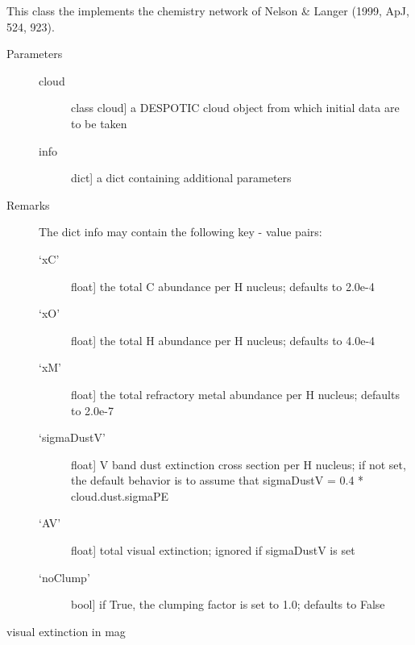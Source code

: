 \documentclass[letterpaper,10pt,english]{sphinxmanual}
\begin{document}
\begin{fulllineitems}
\label{fulldoc:despotic.chemistry.NL99}
This class the implements the chemistry network of Nelson \& Langer
(1999, ApJ, 524, 923).
\begin{description}
\item[{Parameters}] \leavevmode\begin{description}
\item[{cloud}] \leavevmode{[}class cloud{]}
a DESPOTIC cloud object from which initial data are to be
taken

\item[{info}] \leavevmode{[}dict{]}
a dict containing additional parameters

\end{description}

\item[{Remarks}] \leavevmode
The dict info may contain the following key - value pairs:
\begin{description}
\item[{`xC'}] \leavevmode{[}float{]}
the total C abundance per H nucleus; defaults to 2.0e-4

\item[{`xO'}] \leavevmode{[}float{]}
the total H abundance per H nucleus; defaults to 4.0e-4

\item[{`xM'}] \leavevmode{[}float{]}
the total refractory metal abundance per H
nucleus; defaults to 2.0e-7

\item[{`sigmaDustV'}] \leavevmode{[}float{]}
V band dust extinction cross
section per H nucleus; if not set, the default behavior
is to assume that sigmaDustV = 0.4 * cloud.dust.sigmaPE

\item[{`AV'}] \leavevmode{[}float{]}
total visual extinction; ignored if sigmaDustV is set

\item[{`noClump'}] \leavevmode{[}bool{]}
if True, the clumping factor is set to 1.0; defaults to False

\end{description}

\end{description}

\begin{fulllineitems}
\label{fulldoc:despotic.chemistry.NL99.AV}
visual extinction in mag


\end{fulllineitems}
\end{fulllineitems}
\end{document}
